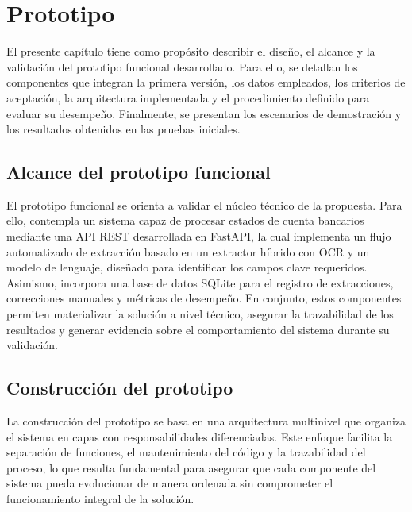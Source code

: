 \chapter{Prototipo}\label{chap:prototipo}

El presente capítulo tiene como propósito describir el diseño, el alcance y la validación del prototipo funcional desarrollado. Para ello, se detallan los componentes que integran la primera versión, los datos empleados, los criterios de aceptación, la arquitectura implementada y el procedimiento definido para evaluar su desempeño. Finalmente, se presentan los escenarios de demostración y los resultados obtenidos en las pruebas iniciales.

\section{Alcance del prototipo funcional}
El prototipo funcional se orienta a validar el núcleo técnico de la propuesta. Para ello, contempla un sistema capaz de procesar estados de cuenta bancarios mediante una API REST desarrollada en FastAPI, la cual implementa un flujo automatizado de extracción basado en un extractor híbrido con OCR y un modelo de lenguaje, diseñado para identificar los campos clave requeridos. Asimismo, incorpora una base de datos SQLite para el registro de extracciones, correcciones manuales y métricas de desempeño. En conjunto, estos componentes permiten materializar la solución a nivel técnico, asegurar la trazabilidad de los resultados y generar evidencia sobre el comportamiento del sistema durante su validación.


\section{Construcción del prototipo}

La construcción del prototipo se basa en una arquitectura multinivel que organiza el sistema en capas con responsabilidades diferenciadas. Este enfoque facilita la separación de funciones, el mantenimiento del código y la trazabilidad del proceso, lo que resulta fundamental para asegurar que cada componente del sistema pueda evolucionar de manera ordenada sin comprometer el funcionamiento integral de la solución.

